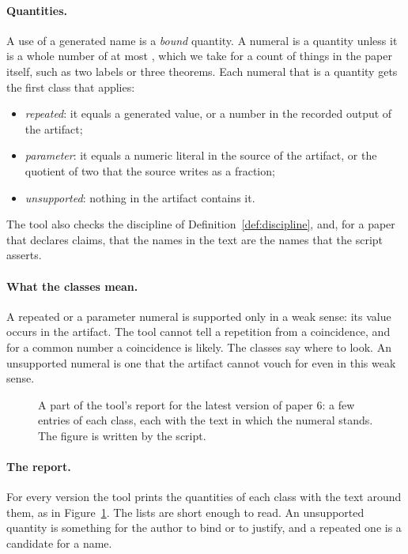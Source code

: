 \documentclass[acmsmall,nonacm,screen]{acmart}
\begin{document}
\paragraph{Quantities.} A use of a generated name is a \emph{bound} quantity. A numeral is a
quantity unless it is a whole number of at most \exSmallLimit{}, which we take for a count of
things in the paper itself, such as two labels or three theorems. Each numeral that is a
quantity gets the first class that applies:
\begin{itemize}
\item \emph{repeated}: it equals a generated value, or a number in the recorded output of
  the artifact;
\item \emph{parameter}: it equals a numeric literal in the source of the artifact, or the
  quotient of two that the source writes as a fraction;
\item \emph{unsupported}: nothing in the artifact contains it.
\end{itemize}
The tool also checks the discipline of Definition~\ref{def:discipline}, and, for a paper
that declares claims, that the names in the text are the names that the script asserts.

\paragraph{What the classes mean.} A repeated or a parameter numeral is supported only in a
weak sense: its value occurs in the artifact. The tool cannot tell a repetition from a
coincidence, and for a common number a coincidence is likely. The classes say where to look.
An unsupported numeral is one that the artifact cannot vouch for even in this weak sense.

\begin{figure}[t]
\small

\caption{A part of the tool's report for the latest version of paper 6: a few entries of each
class, each with the text in which the numeral stands. The figure is written by the script.}
\label{fig:excerpt}
\end{figure}

\paragraph{The report.} For every version the tool prints the quantities of each class with
the text around them, as in Figure~\ref{fig:excerpt}. The lists are short enough to read. An
unsupported quantity is something for the author to bind or to justify, and a repeated one
is a candidate for a name.
\end{document}
